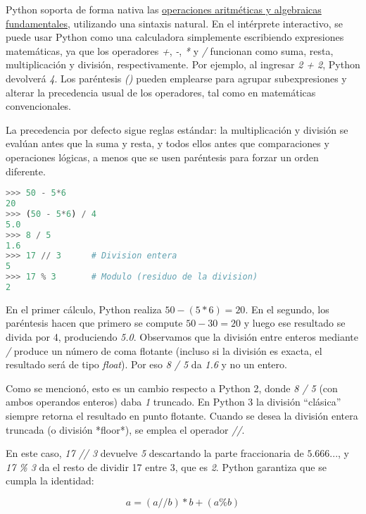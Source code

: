 Python soporta de forma nativa las 
\href{https://docs.python.org/3/tutorial/introduction.html\#using-python-as-a-calculator}{operaciones aritméticas y algebraicas fundamentales}, 
utilizando una sintaxis natural. En el intérprete interactivo, se puede usar Python como una calculadora simplemente escribiendo expresiones matemáticas, 
ya que los operadores \textit{+}, \textit{-}, \textit{*} y \textit{/} funcionan como suma, resta, multiplicación y división, respectivamente. 
Por ejemplo, al ingresar \textit{2 + 2}, Python devolverá \textit{4}. 
Los paréntesis \textit{()} pueden emplearse para agrupar subexpresiones y alterar la precedencia usual de los operadores, 
tal como en matemáticas convencionales. 


La precedencia por defecto sigue reglas estándar: la multiplicación y división se evalúan antes que la suma y resta, 
y todos ellos antes que comparaciones y operaciones lógicas, a menos que se usen paréntesis para forzar un orden diferente.

\begin{lstlisting}[language=Python, caption={Operaciones en Python.}]
>>> 50 - 5*6
20
>>> (50 - 5*6) / 4
5.0
>>> 8 / 5
1.6
>>> 17 // 3      # Division entera
5
>>> 17 % 3       # Modulo (residuo de la division)
2
\end{lstlisting}

En el primer cálculo, Python realiza $50 - (5*6) = 20$. En el segundo, los paréntesis hacen que primero se compute 
$50 - 30 = 20$ y luego ese resultado se divida por 4, produciendo \textit{5.0}. 
Observamos que la división entre enteros mediante \textit{/} produce un número de coma flotante (incluso si la división es exacta, 
el resultado será de tipo \textit{float}). Por eso \textit{8 / 5} da \textit{1.6} y no un entero. 

Como se mencionó, esto es un cambio respecto a Python 2, donde \textit{8 / 5} (con ambos operandos enteros) daba \textit{1} truncado. 
En Python 3 la división “clásica” siempre retorna el resultado en punto flotante. 
Cuando se desea la división entera truncada (o división *floor*), se emplea el operador \textit{//}. 

En este caso, \textit{17 // 3} devuelve \textit{5} descartando la parte fraccionaria de $5.666...$, 
y \textit{17 \% 3} da el resto de dividir 17 entre 3, que es \textit{2}. 
Python garantiza que se cumpla la identidad:

\[
a = (a // b) * b + (a \% b)
\]

